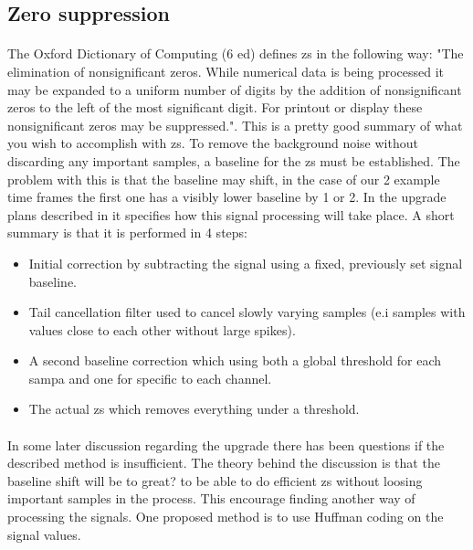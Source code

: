 \documentclass[a4paper]{report}
\begin{document}
\subsection{Zero suppression} %
\paragraph{}
The Oxford Dictionary of Computing (6 ed) defines \gls{zs} in the following way: "The elimination of nonsignificant zeros.
While numerical data is being processed it may be expanded to a uniform number of digits by the addition of nonsignificant zeros to the left of the most significant digit.
For printout or display these nonsignificant zeros may be suppressed."\cite{zerosuppression}.
This is a pretty good summary of what you wish to accomplish with \gls{zs}.
To remove the background noise without discarding any important samples, a baseline for the \gls{zs} must be established.
The problem with this is that the baseline may shift, in the case of our 2 example time frames the first one has a visibly lower baseline by 1 or 2.
In the upgrade plans described in \cite{tdr-015} it specifies how this signal processing will take place.
A short summary is that it is performed in 4 steps:

\begin{itemize}
	\item Initial correction by subtracting the signal using a fixed, previously set signal baseline.
	\item Tail cancellation filter used to cancel slowly varying samples (e.i samples with values close to each other without large spikes).
	\item A second baseline correction which using both a global threshold for each \gls{sampa} and one for specific to each channel.
	\item The actual \gls{zs} which removes everything under a threshold.
\end{itemize}

\paragraph{}
In some later discussion regarding the upgrade there has been questions if the described method is insufficient.
The theory behind the discussion is that the baseline shift will be to great? to be able to do efficient \gls{zs} without loosing important samples in the process.
This encourage finding another way of processing the signals.
One proposed method is to use Huffman coding on the signal values.
\end{document}
